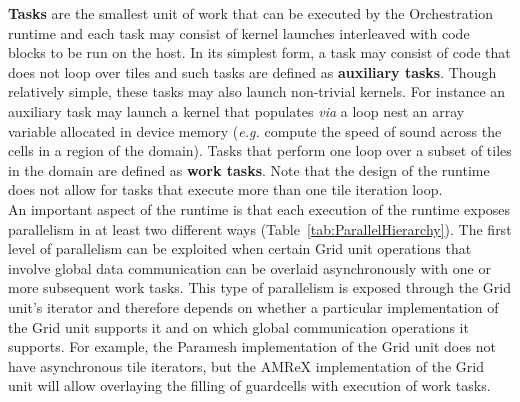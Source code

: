 \documentclass{article}
\begin{document}
\textbf{Tasks} are the smallest unit of work that can be executed by the
Orchestration runtime and each task may consist of kernel launches interleaved
with code blocks to be run on the host.  In its simplest form, a task may
consist of code that does not loop over tiles and such tasks are defined as
\textbf{auxiliary tasks}.  Though relatively simple, these tasks may also launch
non-trivial kernels.  For instance an auxiliary task may launch a kernel that
populates \textit{via} a loop nest an array variable allocated in device memory
(\textit{e.g.} compute the speed of sound across the cells in a region of the
domain).  Tasks that perform one loop over a subset of tiles in the domain are
defined as \textbf{work tasks}.  Note that the design of the runtime does not
allow for tasks that execute more than one tile iteration loop.\\

An important aspect of the runtime is that each execution of the runtime exposes
parallelism in at least two different ways (Table~\ref{tab:ParallelHierarchy}).
The first level of parallelism can be exploited when certain Grid unit
operations that involve global data communication can be overlaid asynchronously
with one or more subsequent work tasks.  This type of parallelism is exposed
through the Grid unit's iterator and therefore depends on whether a particular
implementation of the Grid unit supports it and on which global communication
operations it supports.  For example, the Paramesh implementation of the Grid
unit does not have asynchronous tile iterators, but the AMReX implementation of the
Grid unit will allow overlaying the filling of guardcells with execution of work
tasks.\\
\end{document}
